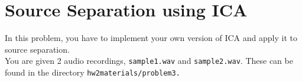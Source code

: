 






\iffalse

\section{Source Separation using ICA}


In this problem, you have to implement your own version of ICA and apply it to source separation.\\
You are given 2 audio recordings, \texttt{sample1.wav} and \texttt{sample2.wav}. These can be found in the directory
\texttt{hw2materials/problem3.}

